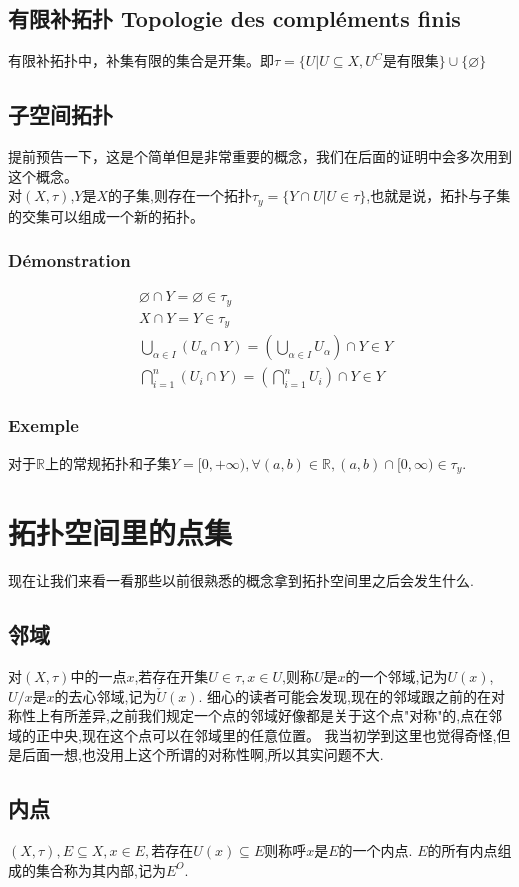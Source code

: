 \documentclass[12pt, a4paper, oneside]{ctexbook}
\begin{document}
  \subsection{有限补拓扑 Topologie des compléments finis}
  有限补拓扑中，补集有限的集合是开集。即$\tau=\{U|U\subseteq X,U^C\text{是有限集} \}\cup \{\varnothing\}$

  \subsection{子空间拓扑}\label{myref:soustopo}
  提前预告一下，这是个简单但是非常重要的概念，我们在后面的证明中会多次用到这个概念。\\
  对$(X,\tau)$,$Y$是$X$的子集,则存在一个拓扑$\tau_y=\{Y\cap U| U\in\tau\}$,也就是说，拓扑与子集的交集可以组成一个新的拓扑。
  \subsubsection{Démonstration}
  $$
  \begin{aligned}&
  \varnothing\cap Y=\varnothing\in\tau_y\\&
  X\cap Y=Y\in\tau_y\\&
  \bigcup_{\alpha\in I}(U_\alpha\cap Y)=(\bigcup_{\alpha\in I}U_\alpha)\cap Y\in Y\\&
  \bigcap^n_{i=1}(U_i\cap Y)=( \bigcap^n_{i=1}U_i)\cap Y\in Y
  \end{aligned}
  $$
  \subsubsection{Exemple}
  对于$\mathbb{R}$上的常规拓扑和子集$Y=[0,+\infty),\forall (a,b)\in\mathbb{R},(a,b)\cap[0,\infty)\in\tau_y$.
\section{拓扑空间里的点集}
  现在让我们来看一看那些以前很熟悉的概念拿到拓扑空间里之后会发生什么.
  \subsection{邻域}
  对$(X,\tau)$中的一点$x$,若存在开集$U\in\tau, x\in U$,则称$U$是$x$的一个邻域,记为$U(x)$,$U/x$是$x$的去心邻域,记为$\check{U}(x) $.
  细心的读者可能会发现,现在的邻域跟之前的在对称性上有所差异,之前我们规定一个点的邻域好像都是关于这个点"对称"的,点在邻域的正中央,现在这个点可以在邻域里的任意位置。
  我当初学到这里也觉得奇怪,但是后面一想,也没用上这个所谓的对称性啊,所以其实问题不大.
  \subsection{内点}
  $(X,\tau), E\subseteq X,x\in E,\text{若存在} U(x)\subseteq E$则称呼$x$是$E$的一个内点. $E$的所有内点组成的集合称为其内部,记为$E^O$.
\end{document}
